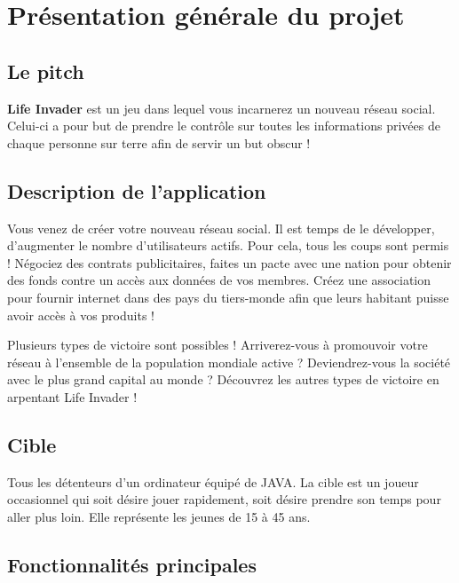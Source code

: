 \chapter{Présentation générale du projet}
\label{chap:premierchapitre}

\section{Le pitch}
\textbf{Life Invader} est un jeu dans lequel vous incarnerez un nouveau réseau social. Celui-ci a pour but de prendre le contrôle sur toutes les informations privées de chaque personne sur terre afin de servir un but obscur !

\section{Description de l'application}

Vous venez de créer votre nouveau réseau social. Il est temps de le développer, d'augmenter le nombre d'utilisateurs actifs. Pour cela, tous les coups sont permis ! Négociez des contrats publicitaires, faites un pacte avec une nation pour obtenir des fonds contre un accès aux données de vos membres. Créez une association pour fournir internet dans des pays du tiers-monde afin que leurs habitant puisse avoir accès à vos produits !

Plusieurs types de victoire sont possibles ! Arriverez-vous à promouvoir votre réseau à l'ensemble de la population mondiale active ? Deviendrez-vous la société avec le plus grand capital au monde ? Découvrez les autres types de victoire en arpentant Life Invader !

\section{Cible}

Tous les détenteurs d'un ordinateur équipé de JAVA. La cible est un joueur occasionnel qui soit désire jouer rapidement, soit désire prendre son temps pour aller plus loin. Elle représente les jeunes de 15 à 45 ans.

\section{Fonctionnalités principales}

